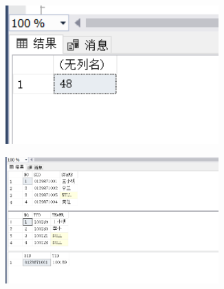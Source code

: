 \documentclass[a4paper,twoside]{article}
\begin{document}
\begin{spacing}{1.2}
\begin{enumerate}
\begin{figure}[h]
\centering
\caption{运行结果}
\begin{subfigure}{0.3\textwidth}
  \includegraphics[width=0.9\textwidth]{fig36.png}
\end{subfigure}
\begin{subfigure}{0.3\textwidth}
  \includegraphics[width=0.9\textwidth]{fig37.png}
\end{subfigure}
\end{figure}

\end{enumerate}

\end{spacing}
\end{document}
